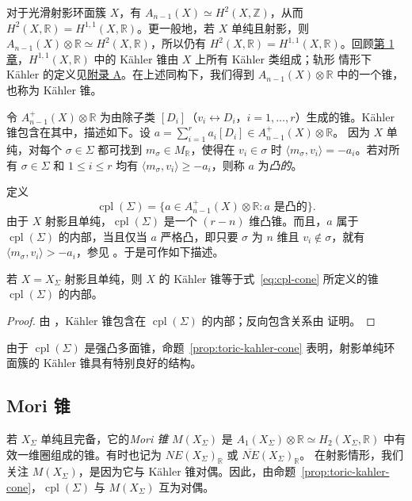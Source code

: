 对于光滑射影环面簇 $X$，有 $A_{n-1}(X)\simeq H^2(X,\mathbb Z)$，从而 $H^2(X,\mathbb R)=H^{1,1}(X,\mathbb R)$。更一般地，若 $X$ 单纯且射影，则 $A_{n-1}(X)\otimes\mathbb R\simeq H^2(X,\mathbb R)$，所以仍有 $H^2(X,\mathbb R)=H^{1,1}(X,\mathbb R)$。回顾\hyperref[chap:introduction]{第 1 章}，$H^{1,1}(X,\mathbb R)$ 中的 Kähler 锥由 $X$ 上所有 Kähler 类组成；轨形 情形下 Kähler 的定义见\hyperref[app:singular-varieties]{附录 A}。在上述同构下，我们得到 $A_{n-1}(X)\otimes\mathbb R$ 中的一个锥，也称为 Kähler 锥。

令 $A^+_{n-1}(X)\otimes\mathbb R$ 为由除子类 $[D_i]$（$v_i\leftrightarrow D_i$，$i=1,\ldots,r$）生成的锥。Kähler 锥包含在其中，描述如下。设
$a=\sum_{i=1}^{r}a_i[D_i]\in A^+_{n-1}(X)\otimes\mathbb R$。
因为 $X$ 单纯，对每个 $\sigma\in\Sigma$ 都可找到 $m_\sigma\in M_{\mathbb R}$，使得在 $v_i\in\sigma$ 时 $\langle m_\sigma,v_i\rangle=-a_i$。若对所有 $\sigma\in\Sigma$ 和 $1\leq i\leq r$ 均有 $\langle m_\sigma,v_i\rangle\geq-a_i$，则称 $a$ 为\emph{凸的}。

定义
\begin{equation}\label{eq:cpl-cone}
\operatorname{cpl}(\Sigma)=
\{a\in A^+_{n-1}(X)\otimes\mathbb R:a\text{ 是凸的}\}.
\end{equation}
由于 $X$ 射影且单纯，$\operatorname{cpl}(\Sigma)$ 是一个 $(r-n)$ 维凸锥。而且，$a$ 属于 $\operatorname{cpl}(\Sigma)$ 的内部，当且仅当 $a$ 严格凸，即只要 $\sigma$ 为 $n$ 维且 $v_i\notin\sigma$，就有 $\langle m_\sigma,v_i\rangle>-a_i$，参见 。于是可作如下描述。

\begin{proposition}\label{prop:toric-kahler-cone}
若 $X=X_\Sigma$ 射影且单纯，则 $X$ 的 Kähler 锥等于式~\eqref{eq:cpl-cone} 所定义的锥 $\operatorname{cpl}(\Sigma)$ 的内部。
\end{proposition}
\begin{proof}
由 ，Kähler 锥包含在 $\operatorname{cpl}(\Sigma)$ 的内部；反向包含关系由  证明。
\end{proof}

由于 $\operatorname{cpl}(\Sigma)$ 是强凸多面锥，命题~\ref{prop:toric-kahler-cone} 表明，射影单纯环面簇的 Kähler 锥具有特别良好的结构。

\subsection{Mori 锥}\label{subsec:toric-mori-cone}

若 $X_\Sigma$ 单纯且完备，它的\emph{Mori 锥} $M(X_\Sigma)$ 是
$A_1(X_\Sigma)\otimes\mathbb R\simeq H_2(X_\Sigma,\mathbb R)$
中有效一维圈组成的锥。有时也记为
$NE(X_\Sigma)_{\mathbb R}$ 或 $\overline{NE}(X_\Sigma)_{\mathbb R}$。
在射影情形，我们关注 $M(X_\Sigma)$，是因为它与 Kähler 锥对偶。因此，由命题~\ref{prop:toric-kahler-cone}，$\operatorname{cpl}(\Sigma)$ 与 $M(X_\Sigma)$ 互为对偶。

